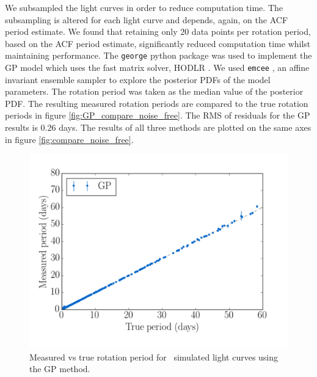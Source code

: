 We subsampled the light curves in order to reduce computation time.
The subsampling is altered for each light curve and depends, again, on the ACF
period estimate.
We found that retaining only 20 data points per rotation period, based on the
ACF period estimate, significantly reduced computation time whilst maintaining
performance.
The {\tt george} \citep{George} python package was used to implement the GP
model which uses the fast matrix solver, HODLR \citep{Ambikasaran2014}.
We used {\tt emcee} \citep{Foreman-Mackey2013}, an affine invariant ensemble
sampler to explore the posterior PDFs of the model parameters.
The rotation period was taken as the median value of the posterior PDF.
The resulting measured rotation periods are compared to the true rotation
periods in figure \ref{fig:GP_compare_noise_free}.
The RMS of residuals for the GP results is 0.26 days.
The results of all three methods are plotted on the same axes in figure
\ref{fig:compare_noise_free}.


\begin{figure}
\begin{center}
\includegraphics[width=6in, clip=true]{figures/compare_gp.pdf}
\caption[GP results.]
{Measured vs true rotation period for \nlightcurves\ simulated light
curves using the GP method.}
\end{center}
\end{figure}
\label{fig:GP_compare_noise_free}


